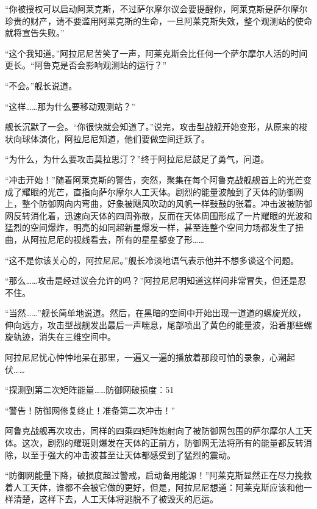 “你被授权可以启动阿莱克斯，不过萨尔摩尔议会要提醒你，阿莱克斯是萨尔摩尔珍贵的财产，请不要滥用阿莱克斯的生命，一旦阿莱克斯失效，整个观测站的使命就将宣告失败。”

“这个我知道。”阿拉尼尼苦笑了一声，阿莱克斯会比任何一个萨尔摩尔人活的时间更长。“阿鲁克是否会影响观测站的运行？”

“不会。”舰长说道。

“这样……那为什么要移动观测站？”

舰长沉默了一会。“你很快就会知道了。”说完，攻击型战舰开始变形，从原来的梭状向球体演化，阿拉尼尼知道，他们要做空间迁跃了。

“为什么，为什么要攻击莫拉思汀？”终于阿拉尼尼鼓足了勇气，问道。

“冲击开始！”随着阿莱克斯的警告，突然，聚集在每个阿鲁克战舰舰首上的光芒变成了耀眼的光芒，直指向萨尔摩尔人工天体。剧烈的能量波触到了天体的防御网上，整个防御网向内弯曲，好象被飓风吹动的风帆一样鼓鼓的张着。冲击波被防御网反转消化着，迅速向天体的四周弥散，反而在天体周围形成了一片耀眼的光波和猛烈的空间爆炸，明亮的如同超新星爆发一样，甚至连整个空间力场都发生了扭曲，从阿拉尼尼的视线看去，所有的星星都变了形……

“这不是你该关心的，阿拉尼尼。”舰长冷淡地语气表示他并不想多谈这个问题。

“那么……攻击是经过议会允许的吗？”阿拉尼尼明知道这样问非常冒失，但还是忍不住。

“当然……”舰长简单地说道。然后，在黑暗的空间中开始出现一道道的螺旋光纹，伸向远方，攻击型战舰发出最后一声喘息，尾部喷出了黄色的能量波，沿着那些螺旋轨迹，消失在三维空间中。

阿拉尼尼忧心忡忡地呆在那里，一遍又一遍的播放着那段可怕的录象，心潮起伏……

“探测到第二次矩阵能量……防御网破损度：51%

“警告！防御网修复终止！准备第二次冲击！”

阿鲁克战舰再次攻击，同样的四乘四矩阵炮射向了被防御网包围的萨尔摩尔人工天体。这次，剧烈的耀斑则爆发在天体的正前方，防御网无法将所有的能量都反转消除，以至于强大的冲击波甚至让天体都感受到了猛烈的震动。

“防御网能量下降，破损度超过警戒，启动备用能源！”阿莱克斯显然正在尽力挽救着人工天体，谁都不会被它做的更好，但是，阿拉尼尼想道：阿莱克斯应该和他一样清楚，这样下去，人工天体将逃脱不了被毁灭的厄运。

